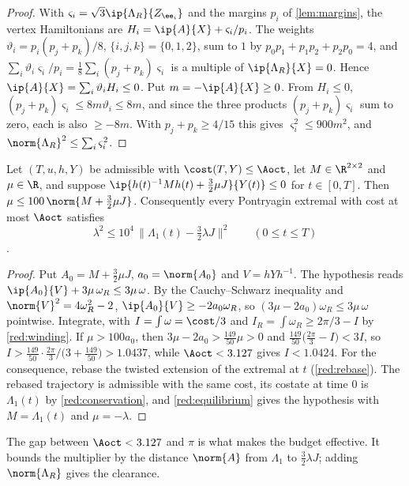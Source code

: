 \begin{proof}
With $\varsigma_i=\sqrt3\ip{\Lambda_R}{Z_{\ee_i}}$ and the margins $p_i$ of \cref{lem:margins}, the
vertex Hamiltonians are $H_i=\ip{A}{X}+\varsigma_i/p_i$. The weights $\vartheta_i=p_i(p_j+p_k)/8$,
$\{i,j,k\}=\{0,1,2\}$, sum to $1$ by $p_0p_1+p_1p_2+p_2p_0=4$, and
$\sum_i\vartheta_i\varsigma_i/p_i=\frac18\sum_i(p_j+p_k)\varsigma_i$ is a multiple of
$\ip{\Lambda_R}{X}=0$. Hence $\ip{A}{X}=\sum_i\vartheta_iH_i\le0$. Put $m=-\ip{A}{X}\ge0$. From
$H_i\le0$, $(p_j+p_k)\varsigma_i\le8m\vartheta_i\le8m$, and since the three products
$(p_j+p_k)\varsigma_i$ sum to zero, each is also $\ge-8m$. With $p_j+p_k\ge4/15$ this gives
$\varsigma_i^2\le900m^2$, and $\norm{\Lambda_R}^2\le\sum_i\varsigma_i^2$.
\end{proof}

\begin{proposition}\label{red:budget}
Let $(T,u,h,Y)$ be admissible with $\cost(T,Y)\le\Aoct$, let $M\in\R^{2\times2}$ and $\mu\in\R$, and
suppose $\ip{h(t)^{-1}Mh(t)+\frac32\mu J}{Y(t)}\le0$ for $t\in[0,T]$. Then
$\mu\le100\,\norm{M+\frac32\mu J}$. Consequently every Pontryagin
extremal with cost at most $\Aoct$ satisfies
\[
\lambda^2\le10^4\,\bigl\lVert\Lambda_1(t)-\tfrac32\lambda J\bigr\rVert^2\qquad(0\le t\le T)
\].
\end{proposition}

\begin{proof}
Put $A_0=M+\frac32\mu J$, $a_0=\norm{A_0}$ and $V=hYh^{-1}$. The hypothesis reads
$\ip{A_0}{V}+3\mu\,\omega_R\le3\mu\,\omega$. By the Cauchy--Schwarz inequality and
$\norm{V}^2=4\omega_R^2-2$, $\ip{A_0}{V}\ge-2a_0\omega_R$, so
$(3\mu-2a_0)\omega_R\le3\mu\,\omega$ pointwise. Integrate, with $I=\int\omega=\cost/3$ and
$I_R=\int\omega_R\ge2\pi/3-I$ by \cref{red:winding}. If $\mu>100a_0$, then
$3\mu-2a_0>\frac{149}{50}\mu>0$ and $\frac{149}{50}\bigl(\frac{2\pi}3-I\bigr)<3I$, so
$I>\frac{149}{50}\cdot\frac{2\pi}{3}\big/\bigl(3+\frac{149}{50}\bigr)>1.0437$, while
$\Aoct<3.127$ gives $I<1.0424$. For the consequence, rebase
the twisted extension of the extremal at $t$ (\cref{red:rebase}). The rebased trajectory is
admissible with the same cost, its costate at time $0$ is $\Lambda_1(t)$ by \cref{red:conservation},
and \cref{red:equilibrium} gives the hypothesis with $M=\Lambda_1(t)$ and $\mu=-\lambda$.
\end{proof}

The gap between $\Aoct<3.127$ and $\pi$ is what makes the budget effective. It bounds the
multiplier by the distance $\norm{A}$ from $\Lambda_1$ to $\frac32\lambda J$; adding
$\norm{\Lambda_R}$ gives the clearance.

